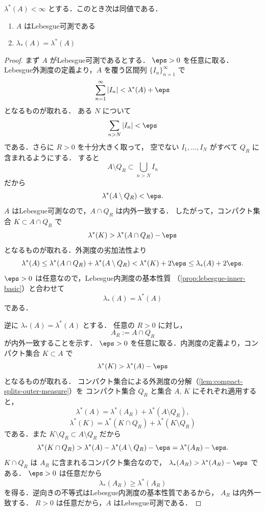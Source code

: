 \begin{theorem}[有限外測度集合の可測性]\label{thm:finite-outer-measurable-iff-inner-outer}
$\lambda^*(A)<\infty$ とする．このとき次は同値である．
\begin{enumerate}
    \item $A$ はLebesgue可測である
    \item $\lambda_*(A)=\lambda^*(A)$
\end{enumerate}
\end{theorem}
\begin{proof}
まず $A$ がLebesgue可測であるとする．
$\eps>0$ を任意に取る．
Lebesgue外測度の定義より，$A$ を覆う区間列 $\{I_n\}_{n=1}^{\infty}$ で
\[
\sum_{n=1}^{\infty}|I_n|<\lambda^*(A)+\eps
\]
となるものが取れる．
ある $N$ について
\[
\sum_{n>N}|I_n|<\eps
\]
である．さらに $R>0$ を十分大きく取って，
空でない $I_1,\dots,I_N$ がすべて $Q_R$ に含まれるようにする．
すると
\[
A\setminus Q_R\subset\bigcup_{n>N} I_n
\]
だから
\[
\lambda^*(A\setminus Q_R)<\eps.
\]
$A$ はLebesgue可測なので，$A\cap Q_R$ は内外一致する．
したがって，コンパクト集合 $K\subset A\cap Q_R$ で
\[
\lambda^*(K)>\lambda^*(A\cap Q_R)-\eps
\]
となるものが取れる．外測度の劣加法性より
\[
\lambda^*(A)
\le
\lambda^*(A\cap Q_R)+\lambda^*(A\setminus Q_R)
<
\lambda^*(K)+2\eps
\le
\lambda_*(A)+2\eps.
\]
$\eps>0$ は任意なので，Lebesgue内測度の基本性質
（\cref{prop:lebesgue-inner-basic}）と合わせて
\[
\lambda_*(A)=\lambda^*(A)
\]
である．

逆に $\lambda_*(A)=\lambda^*(A)$ とする．
任意の $R>0$ に対し，
\[
A_R:=A\cap Q_R
\]
が内外一致することを示す．
$\eps>0$ を任意に取る．内測度の定義より，コンパクト集合 $K\subset A$ で
\[
\lambda^*(K)>\lambda^*(A)-\eps
\]
となるものが取れる．
コンパクト集合による外測度の分解（\cref{lem:compact-splits-outer-measure}）を
コンパクト集合 $Q_R$ と集合 $A,\,K$ にそれぞれ適用すると，
\[
\lambda^*(A)=\lambda^*(A_R)+\lambda^*(A\setminus Q_R),
\]
\[
\lambda^*(K)
=
\lambda^*(K\cap Q_R)+\lambda^*(K\setminus Q_R)
\]
である．また $K\setminus Q_R\subset A\setminus Q_R$ だから
\[
\lambda^*(K\cap Q_R)
>
\lambda^*(A)-\lambda^*(A\setminus Q_R)-\eps
=
\lambda^*(A_R)-\eps.
\]
$K\cap Q_R$ は $A_R$ に含まれるコンパクト集合なので，
$\lambda_*(A_R)>\lambda^*(A_R)-\eps$ である．
$\eps>0$ は任意だから
\[
\lambda_*(A_R)\ge \lambda^*(A_R)
\]
を得る．逆向きの不等式はLebesgue内測度の基本性質であるから，
$A_R$ は内外一致する．
$R>0$ は任意だから，$A$ はLebesgue可測である．
\end{proof}

